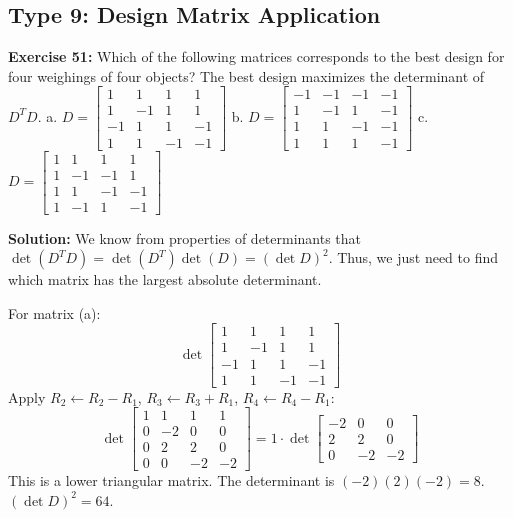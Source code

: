 \documentclass{article}
\begin{document}
\subsection{Type 9: Design Matrix Application}

\textbf{Exercise 51:} Which of the following matrices corresponds to the best design for four weighings of four objects? The best design maximizes the determinant of $D^T D$.
a. $D = \begin{bmatrix} 1 & 1 & 1 & 1 \\ 1 & -1 & 1 & 1 \\ -1 & 1 & 1 & -1 \\ 1 & 1 & -1 & -1 \end{bmatrix}$
b. $D = \begin{bmatrix} -1 & -1 & -1 & -1 \\ 1 & -1 & 1 & -1 \\ 1 & 1 & -1 & -1 \\ 1 & 1 & 1 & -1 \end{bmatrix}$
c. $D = \begin{bmatrix} 1 & 1 & 1 & 1 \\ 1 & -1 & -1 & 1 \\ 1 & 1 & -1 & -1 \\ 1 & -1 & 1 & -1 \end{bmatrix}$

\textbf{Solution:}
We know from properties of determinants that $\det(D^T D) = \det(D^T)\det(D) = (\det D)^2$. Thus, we just need to find which matrix has the largest absolute determinant.

For matrix (a):
\[ \det \begin{bmatrix} 1 & 1 & 1 & 1 \\ 1 & -1 & 1 & 1 \\ -1 & 1 & 1 & -1 \\ 1 & 1 & -1 & -1 \end{bmatrix} \]
Apply $R_2 \leftarrow R_2 - R_1$, $R_3 \leftarrow R_3 + R_1$, $R_4 \leftarrow R_4 - R_1$:
\[ \det \begin{bmatrix} 1 & 1 & 1 & 1 \\ 0 & -2 & 0 & 0 \\ 0 & 2 & 2 & 0 \\ 0 & 0 & -2 & -2 \end{bmatrix} = 1 \cdot \det \begin{bmatrix} -2 & 0 & 0 \\ 2 & 2 & 0 \\ 0 & -2 & -2 \end{bmatrix} \]
This is a lower triangular matrix. The determinant is $(-2)(2)(-2) = 8$.
$(\det D)^2 = 64$.
\end{document}
